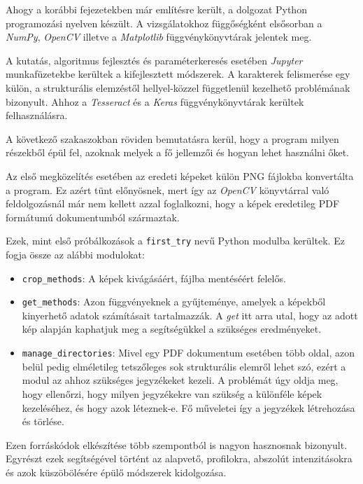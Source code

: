 
Ahogy a korábbi fejezetekben már említésre került, a dolgozat Python programozási nyelven készült.
A vizsgálatokhoz függőségként elsősorban a \textit{NumPy}, \textit{OpenCV} illetve a \textit{Mat\-plot\-lib} függvénykönyvtárak jelentek meg.

A kutatás, algoritmus fejlesztés és paraméterkeresés esetében \textit{Jupyter} munkafüzetekbe kerültek a kifejlesztett módszerek.
A karakterek felismerése egy külön, a strukturális elemzéstől hellyel-közzel függetlenül kezelhető problémának bizonyult. Ahhoz a \textit{Tesseract} és a \textit{Keras} függvénykönyvtárak kerültek felhasználásra.

A következő szakaszokban röviden bemutatásra kerül, hogy a program milyen részekből épül fel, azoknak melyek a fő jellemzői és hogyan lehet használni őket.


Az első megközelítés esetében az eredeti képeket külön PNG fájlokba konvertálta a program. Ez azért tünt előnyösnek, mert így az \textit{OpenCV} könyvtárral való feldolgozásnál már nem kellett azzal foglalkozni, hogy a képek eredetileg PDF formátumú dokumentumból származtak.

Ezek, mint első próbálkozások a \texttt{first\_try} nevű Python modulba kerültek. Ez fogja össze az alábbi modulokat:
\begin{itemize}
\item \texttt{crop\_methods}: A képek kivágásáért, fájlba mentéséért felelős.
\item \texttt{get\_methods}: Azon függvényeknek a gyűjteménye, amelyek a képekből kinyerhető adatok számításait tartalmazzák. A \textit{get} itt arra utal, hogy az adott kép alapján kaphatjuk meg a segítségükkel a szükséges eredményeket.
\item \texttt{manage\_directories}: Mivel egy PDF dokumentum esetében több oldal, azon belül pedig elméletileg tetszőleges sok strukturális elemről lehet szó, ezért a modul az ahhoz szükséges jegyzékeket kezeli. A problémát úgy oldja meg, hogy ellenőrzi, hogy milyen jegyzékekre van szükség a különféle képek kezeléséhez, és hogy azok léteznek-e. Fő műveletei így a jegyzékek létrehozása és törlése.
\end{itemize}

Ezen forráskódok elkészítése több szempontból is nagyon hasznosnak bizonyult. Egyrészt ezek segítségével történt az alapvető, profilokra, abszolút intenzitásokra és azok küszöbölésére épülő módszerek kidolgozása.

